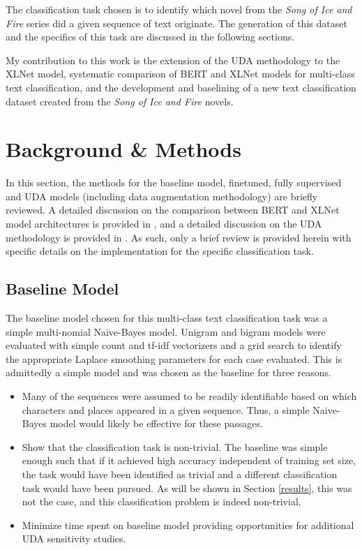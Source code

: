 \documentclass[twoside,twocolumn,10pt]{article}
\begin{document}
The classification task chosen is to identify which novel from the {\it Song of Ice and Fire} series did a given sequence of text originate. The generation of this dataset and the specifics of this task are discussed in the following sections.

My contribution to this work is the extension of the UDA methodology to the XLNet model, systematic comparison of BERT and XLNet models for multi-class text classification, and the development and baselining of a new text classification dataset created from the \textit{Song of Ice and Fire} novels.

\section{Background \& Methods} \label{background}

In this section, the methods for the baseline model, finetuned, fully supervised and UDA models (including data augmentation methodology) are briefly reviewed. A detailed discussion on the comparison between BERT and XLNet model architectures is provided in \cite{Yang:2019}, and a detailed discussion on the UDA methodology is provided in \cite{Xie:2019}. As such, only a brief review is provided herein with specific details on the implementation for the specific classification task.

\subsection{Baseline Model}
The baseline model chosen for this multi-class text classification task was a simple multi-nomial Naive-Bayes model. Unigram and bigram models were evaluated with simple count and tf-idf vectorizers and a grid search to identify the appropriate Laplace smoothing parameters for each case evaluated. This is admittedly a simple model and was chosen as the baseline for three reasons.
\begin{itemize}
 	\item Many of the sequences were assumed to be readily identifiable based on which characters and places appeared in a given sequence. Thus, a simple Naive-Bayes model would likely be effective for these passages.
 	\item Show that the classification task is non-trivial. The baseline was simple enough such that if it achieved high accuracy independent of training set size, the task would have been identified as trivial and a different classification task would have been pursued. As will be shown in Section \ref{results}, this was not the case, and this classification problem is indeed non-trivial. 
 	\item Minimize time spent on baseline model providing opportunities for additional UDA sensitivity studies.
 \end{itemize}
\end{document}
